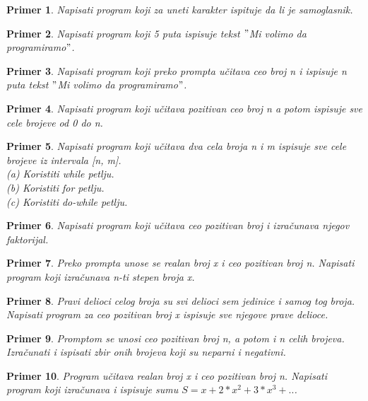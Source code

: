 \documentclass[a4paper]{article}
\newtheorem{primer}{Primer}[section]
\begin{document}
\begin{primer}
Napisati program koji za uneti karakter ispituje da li je
samoglasnik.
\end{primer}

\begin{primer}
Napisati program koji 5 puta ispisuje tekst $"$Mi volimo da
programiramo$"$.
\end{primer}

\begin{primer}
Napisati program koji preko prompta učitava ceo broj n i ispisuje n puta
tekst $"$Mi volimo da
programiramo$"$.
\end{primer}

\begin{primer}
Napisati program koji učitava pozitivan ceo broj n a potom
ispisuje sve cele brojeve od 0 do n.
\end{primer}

\begin{primer}
Napisati program koji učitava dva cela broja n i m ispisuje
sve cele brojeve iz intervala [n, m].\\
(a) Koristiti while petlju.\\
(b) Koristiti for petlju.\\
(c) Koristiti do-while petlju.\\
\end{primer}

\begin{primer}
Napisati program koji učitava ceo pozitivan broj i izračunava
njegov faktorijal. 
\end{primer}

\begin{primer}
Preko prompta unose se realan broj x i ceo pozitivan
broj n. Napisati program koji izračunava n-ti stepen broja x.
\end{primer}

\begin{primer}
Pravi delioci celog broja su svi delioci sem jedinice i samog
tog broja. Napisati program za ceo pozitivan broj x ispisuje sve njegove
prave delioce.
\end{primer}

\begin{primer}
Promptom se unosi ceo pozitivan broj n, a potom i n celih
brojeva. Izračunati i ispisati zbir onih brojeva koji su neparni i negativni.
\end{primer}

\begin{primer}
Program učitava realan broj x i ceo pozitivan broj n.
Napisati program koji izračunava i ispisuje sumu $S=x + 2*x^2 + 3*x^3 + ..$.
\end{primer}
\end{document}
